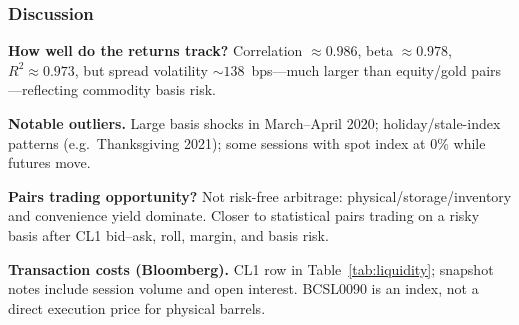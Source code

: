 \subsubsection*{Discussion}

\textbf{How well do the returns track?}
Correlation $\approx 0.986$, beta $\approx 0.978$, $R^2 \approx 0.973$, but spread volatility $\sim 138$~bps---much larger than equity/gold pairs---reflecting commodity basis risk.

\textbf{Notable outliers.}
Large basis shocks in March--April 2020; holiday/stale-index patterns (e.g.\ Thanksgiving 2021); some sessions with spot index at 0\% while futures move.

\textbf{Pairs trading opportunity?}
Not risk-free arbitrage: physical/storage/inventory and convenience yield dominate. Closer to statistical pairs trading on a risky basis after CL1 bid--ask, roll, margin, and basis risk.

\textbf{Transaction costs (Bloomberg).}
CL1 row in Table~\ref{tab:liquidity}; snapshot notes include session volume and open interest. BCSL0090 is an index, not a direct execution price for physical barrels.

% 
